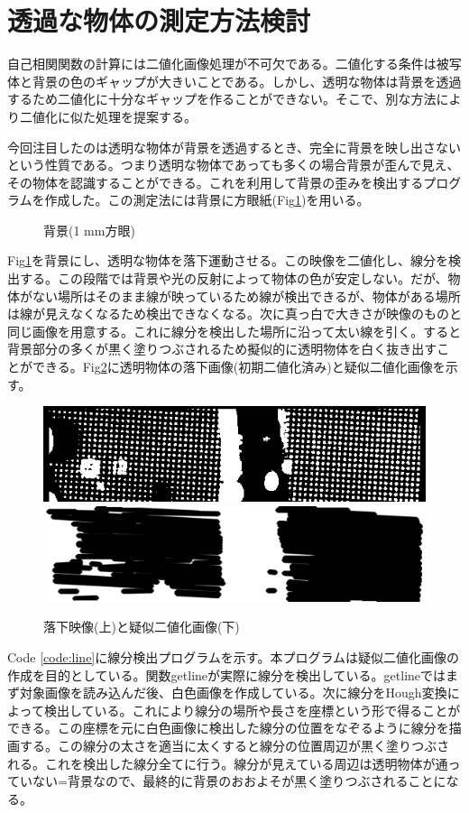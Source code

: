 \documentclass[a4paper,10pt,twocolumn,dvipdfmx]{jsarticle}
\begin{document}
\section{透過な物体の測定方法検討}
自己相関関数の計算には二値化画像処理が不可欠である。二値化する条件は被写体と背景の色のギャップが大きいことである。しかし、透明な物体は背景を透過するため二値化に十分なギャップを作ることができない。そこで、別な方法により二値化に似た処理を提案する。 \par
今回注目したのは透明な物体が背景を透過するとき、完全に背景を映し出さないという性質である。つまり透明な物体であっても多くの場合背景が歪んで見え、その物体を認識することができる。これを利用して背景の歪みを検出するプログラムを作成した。この測定法には背景に方眼紙(Fig\ref{fig:block})を用いる。
\begin{figure}[H]
	\centering
	\caption{背景(1 mm方眼)}
	\label{fig:block}
\end{figure}
Fig\ref{fig:block}を背景にし、透明な物体を落下運動させる。この映像を二値化し、線分を検出する。この段階では背景や光の反射によって物体の色が安定しない。だが、物体がない場所はそのまま線が映っているため線が検出できるが、物体がある場所は線が見えなくなるため検出できなくなる。次に真っ白で大きさが映像のものと同じ画像を用意する。これに線分を検出した場所に沿って太い線を引く。すると背景部分の多くが黒く塗りつぶされるため擬似的に透明物体を白く抜き出すことができる。Fig\ref{fig:line}に透明物体の落下画像(初期二値化済み)と疑似二値化画像を示す。
\begin{figure}[H]
	\includegraphics[scale=0.4]{water_two.png}
	\includegraphics[scale=0.4]{water_line.png}
	\caption{落下映像(上)と疑似二値化画像(下)}
	\label{fig:line}
\end{figure}
Code \ref{code:line}に線分検出プログラムを示す。本プログラムは疑似二値化画像の作成を目的としている。関数getlineが実際に線分を検出している。getlineではまず対象画像を読み込んだ後、白色画像を作成している。次に線分をHough変換によって検出している。これにより線分の場所や長さを座標という形で得ることができる。この座標を元に白色画像に検出した線分の位置をなぞるように線分を描画する。この線分の太さを適当に太くすると線分の位置周辺が黒く塗りつぶされる。これを検出した線分全てに行う。線分が見えている周辺は透明物体が通っていない=背景なので、最終的に背景のおおよそが黒く塗りつぶされることになる。

\end{document}
